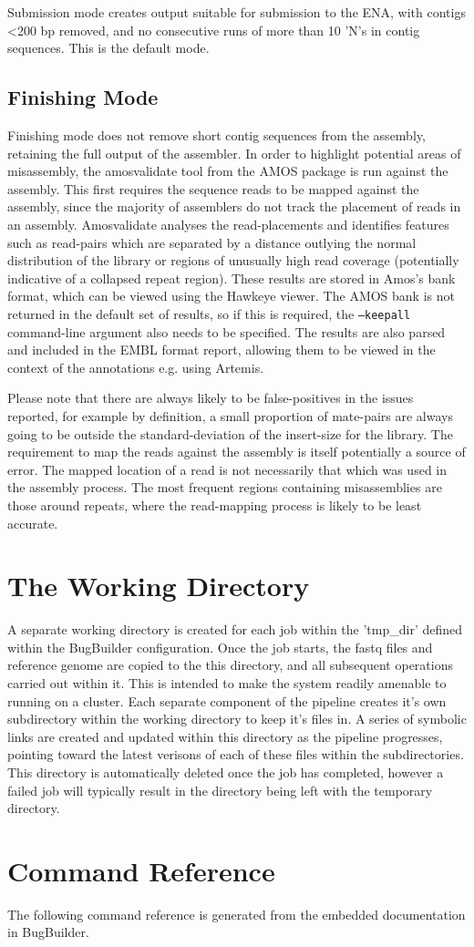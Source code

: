 \documentclass[a4paper,10pt]{article}
\begin{document}
Submission mode creates output suitable for submission to the ENA, with contigs \textless200 bp removed,
and no consecutive runs of more than 10 'N's in contig sequences. This is the default mode. 

\subsection{Finishing Mode}

Finishing mode does not remove short contig sequences from the assembly, retaining the full output
of the assembler. In order to highlight potential areas of misassembly, the amosvalidate tool from
the AMOS package is run against the assembly. This first requires the sequence reads to be mapped
against the assembly, since the majority of assemblers do not track the placement of reads in an
assembly. Amosvalidate analyses the read-placements and identifies features such as read-pairs
which are separated by a distance outlying the normal distribution of the library or regions of
unusually high read coverage (potentially indicative of a collapsed repeat region). These results
are stored in Amos's bank format, which can be viewed using the Hawkeye viewer. The AMOS bank is
not returned in the default set of results, so if this is required, the {\tt --keepall}
command-line argument also needs to be specified. The results are also parsed and included in the
EMBL format report, allowing them to be viewed in the context of the annotations e.g. using
Artemis.

Please note that there are always likely to be false-positives in the issues reported, for example
by definition, a small proportion of mate-pairs are always going to be outside the
standard-deviation of the insert-size for the library. The requirement to map the reads against the
assembly is itself potentially a source of error. The mapped location of a read is not necessarily
that which was used in the assembly process. The most frequent regions containing misassemblies are
those around repeats, where the read-mapping process is likely to be least accurate. 

\section{The Working Directory}

A separate working directory is created for each job within the 'tmp\_dir' defined within the
BugBuilder configuration. Once the job starts, the fastq files and reference genome are copied to
the this directory, and all subsequent operations carried out within it.  This is intended to make
the system readily amenable to running on a cluster.  Each separate component of the pipeline
creates it's own subdirectory within the working directory to keep it's files in. 
A series of symbolic links are created and updated within this directory as the pipeline
progresses, pointing toward the latest verisons of each of these files within the subdirectories.
This directory is automatically deleted once the job has completed, however a failed job will
typically result in the directory being left with the temporary directory.


\section{Command Reference}

The following command reference is generated from the embedded documentation in BugBuilder. 


\end{document}

